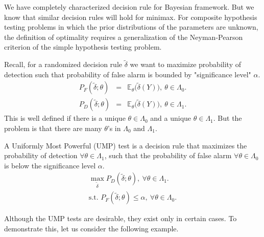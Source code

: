 \documentclass[a4paper,english,12pt]{article}
\begin{document}
We have completely characterized decision rule for Bayesian framework. But we know that similar decision rules will hold for minimax. For composite hypothesis testing problems in which the prior distributions of the parameters are unknown, the definition of optimality requires a generalization of the Neyman-Pearson criterion of the simple hypothesis testing problem.
\par Recall, for a randomized decision rule $\tilde{\delta}$ we want to maximize probability of detection such that probability of false alarm is bounded by "significance level" $\alpha$.
\begin{eqnarray}
P_F(\tilde{\delta}; \theta) &=& \mathbb{E}_\theta\big(\tilde{\delta}(Y)\big), ~ \theta \in \Lambda_0.\\
P_D(\tilde{\delta}; \theta) &=& \mathbb{E}_\theta\big(\tilde{\delta}(Y)\big), ~ \theta \in \Lambda_1.
\end{eqnarray}	
This is well defined if there is a unique $\theta \in \Lambda_0$ and a unique $\theta \in \Lambda_1$. But the problem is that there are many $\theta$'s in $\Lambda_0$ and $\Lambda_1$.
\begin{defn}
A Uniformly Most Powerful (UMP) test is a decision rule that maximizes the probability of detection $\forall \theta \in \Lambda_1$, such that the probability of false alarm $\forall \theta \in \Lambda_0$ is below the significance level $\alpha$.
\begin{eqnarray*}
\max_{\tilde{\delta}}P_D(\tilde{\delta}; \theta), ~ \forall \theta \in \Lambda_1.\\
\mbox{s.t.  } P_F(\tilde{\delta}; \theta) \leq \alpha, ~ \forall \theta \in \Lambda_0.
\end{eqnarray*}	
\end{defn}
Although the UMP tests are desirable, they exist only in certain cases. To demonstrate this, let us consider the following example.
\end{document}
